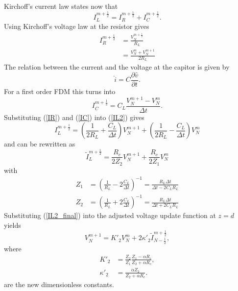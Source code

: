 Kirchoff's current law states now that
\begin{equation}
    I^{m+\frac{1}{2}}_{L} = I^{m+\frac{1}{2}}_{R} + I^{m+\frac{1}{2}}_{C}.
    \label{IL2}
\end{equation}
Using Kirchoff's voltage law at the resistor gives
\begin{align}
    I^{m+\frac{1}{2}}_{R} & = \frac{V^{m+\frac{1}{2}}_{N}}{R_{L}}\nonumber\\
    & = \frac{V^{m}_{N}+V^{m+1}_{N}}{2R_{L}}
    \label{IR}
\end{align}
The relation between the current and the voltage at the capitor is given by
\begin{equation}
    \hat{i} = C\frac{\partial \hat{v}}{\partial t}.
\end{equation}
For a first order FDM this turns into
\begin{equation}
    I^{m+\frac{1}{2}}_{C} = C_{L}\frac{V^{m+1}_{N} - V^{m}_{N}}{\Delta t}.
    \label{IC}
\end{equation}
Substituting (\ref{IR}) and (\ref{IC}) into (\ref{IL2}) gives
\begin{equation}
    I^{m+\frac{1}{2}}_{L} = \left(\frac{1}{2R_{L}}+\frac{C_{L}}{\Delta t}\right)V^{m+1}_N + \left(\frac{1}{2R_{L}}-\frac{C_{L}}{\Delta t}\right)V^{m}_N
\end{equation}
and can be rewritten as
\begin{equation}
    \tilde{I}^{m+\frac{1}{2}}_{L} = \frac{R_{c}}{2Z_{2}}V^{m+1}_N + \frac{R_{c}}{2Z_{1}}V^{m}_N
    \label{IL2_final}
\end{equation}
with
\begin{align}
    Z_{1} &= \left(\frac{1}{R_{L}}-2\frac{C_{L}}{\Delta t}\right)^{-1} = \frac{R_{L}\Delta t}{\Delta t - 2 C_{L}R_{L}} \nonumber\\
    Z_{2} &= \left(\frac{1}{R_{L}}+2\frac{C_{L}}{\Delta t}\right)^{-1} = \frac{R_{L}\Delta t}{\Delta t + 2 C_{L}R_{L}} \label{eq:Z}
\end{align}
Substituting (\ref{IL2_final}) into the adjusted voltage update function at $z=d$ yields
\begin{equation}
    V^{m+1}_{N} = K'_{2}V^{m}_N + 2\kappa'_{2}\tilde{I}^{m+\frac{1}{2}}_{N-\frac{1}{2}},
\end{equation}
where
\begin{align}
    K'_{2} & = \frac{Z_{2}}{Z_{1}}\frac{Z_{1}-\alpha R_{c}}{Z_{2}+\alpha R_{c}},\\
    \kappa'_{2} & = \frac{\alpha Z_{2}}{Z_{2}+\alpha R_{c}}.
\end{align}
are the new dimensionless constants.

